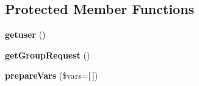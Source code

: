 \subsection*{Protected Member Functions}
\begin{DoxyCompactItemize}
\item 
\hypertarget{classDMA_1_1Friends_1_1Components_1_1GroupRequest_abf24425ad2bc88375097dd15bb35fd01}{{\bfseries getuser} ()}\label{classDMA_1_1Friends_1_1Components_1_1GroupRequest_abf24425ad2bc88375097dd15bb35fd01}

\item 
\hypertarget{classDMA_1_1Friends_1_1Components_1_1GroupRequest_a45abdc367821a9a6d105917f125057e9}{{\bfseries get\-Group\-Request} ()}\label{classDMA_1_1Friends_1_1Components_1_1GroupRequest_a45abdc367821a9a6d105917f125057e9}

\item 
\hypertarget{classDMA_1_1Friends_1_1Components_1_1GroupRequest_a8c20a7584f43b3e79ea92e77f8ba4b45}{{\bfseries prepare\-Vars} (\$vars=\mbox{[}$\,$\mbox{]})}\label{classDMA_1_1Friends_1_1Components_1_1GroupRequest_a8c20a7584f43b3e79ea92e77f8ba4b45}

\end{DoxyCompactItemize}


